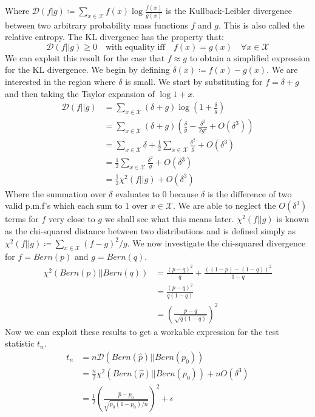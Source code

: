 \documentclass[]{article}
\newcommand{\Xcal}{\mathcal{X}}
\newcommand{\kl}{\mathcal{D}}
\begin{document}
%
Where $\kl(f | g) \coloneqq \sum_{x \in \Xcal} f(x) \log \frac{f(x)}{g(x)}$ is the Kullback-Leibler divergence between two arbitrary probability mass functions $f$ and $g$. This is also called the relative entropy. The KL divergence has the property that:
%
\begin{equation}
\kl (f || g) \geq 0 \quad \text{with equality iff} \quad f(x) = g(x) \quad \forall x \in \Xcal
\end{equation}
%
We can exploit this result for the case that $f \approx g$ to obtain a simplified expression for the KL divergence. We begin by defining $\delta (x) \coloneqq f(x) - g(x)$. We are interested in the region where $\delta$ is small. We start by substituting for $f=\delta + g$ and then taking the Taylor expansion of $\log 1+x$.
%
\begin{align*}
\kl(f||g) &= \sum_{x \in \Xcal} (\delta + g) \log \left(1 + \frac{\delta}{g} \right) \\
&= \sum_{x \in \Xcal} (\delta + g) \left( \frac{\delta}{g} - \frac{\delta^2}{2g^2} + O(\delta^3) \right) \\
&= \sum_{x \in \Xcal} \delta + \frac{1}{2} \sum_{x \in \Xcal} \frac{\delta^2}{g} + O(\delta^3) \\
&= \frac{1}{2} \sum_{x \in \Xcal} \frac{\delta^2}{g} + O(\delta^3) \\
&= \frac{1}{2} \chi^2(f||g) + O(\delta^3)
\end{align*}
%
Where the summation over $\delta$ evaluates to 0 because $\delta$ is the difference of two valid p.m.f's which each sum to 1 over $x \in \Xcal$. We are able to neglect the $O(\delta^3)$ terms for $f$ very close to $g$ we shall see what this means later. $\chi^2(f||g)$ is known as the chi-squared distance between two distributions and is defined simply as $\chi^2(f||g) \coloneqq \sum_{x \in \Xcal} (f-g)^2/g$. We now investigate the chi-squared divergence for $f = Bern(p)$ and $g = Bern(q)$.
%
\begin{align*}
\chi^2(Bern(p)||Bern(q)) &= \frac{(p-q)^2}{q} + \frac{((1-p)-(1-q))^2}{1-q} \\
&= \frac{(p-q)^2}{q(1-q)} \\
&= \left(\frac{p-q}{\sqrt{q(1-q)}}\right)^2
\end{align*}
%
Now we can exploit these results to get a workable expression for the test statistic $t_n$.
%
\begin{align*}
t_n &= n \kl \left(Bern(\hat{p}) || Bern(p_0)\right) \\
	&= \frac{n}{2} \chi^2 \left(Bern(\hat{p}) || Bern(p_0) \right) + nO(\delta^3) \\
	&= \frac{1}{2} \left( \frac{\hat{p} - p_0}{\sqrt{p_0(1-p_0)/n}} \right)^2 + \epsilon
\end{align*}
\end{document}
